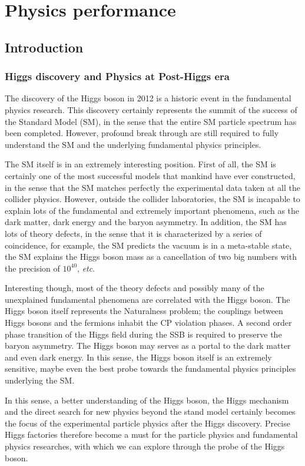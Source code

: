 \chapter{Physics performance}
\label{Chapter:Higgs}

\section{Introduction}
\subsection { Higgs discovery and Physics at Post-Higgs era }
The discovery of the Higgs boson in 2012 is a historic event in the  fundamental physics research.
This discovery certainly represents the summit of the success of the Standard Model (SM),
in the sense that the entire SM particle spectrum has been completed.
However, profound break through are still required to fully understand the SM and the underlying fundamental physics principles. 

The SM itself is in an extremely interesting position.
First of all, the SM is certainly one of the most successful models that mankind have ever constructed,
in the sense that the SM matches perfectly the experimental data taken at all the collider physics.
However, outside the collider laboratories, the SM is incapable to explain lots of the fundamental and extremely important phenomena,
such as the dark matter, dark energy and the baryon asymmetry.
In addition, the SM has lots of theory defects, in the sense that it is characterized by a series of coincidence,
for example, the SM predicts the vacuum is in a meta-stable state,
the SM explains the Higgs boson mass as a cancellation of two big numbers with the precision of $10^{40}$, {\it etc}. 

Interesting though, most of the theory defects and possibly many
of the unexplained fundamental phenomena are correlated with the Higgs boson.
The Higgs boson itself represents the Naturalness problem;
the couplings between Higgs bosons and the fermions inhabit the CP violation phases.
A second order phase transition of the Higgs field during the SSB is required to preserve the baryon asymmetry.
The Higgs boson may serves as a portal to the dark matter and even dark energy.
In this sense, the Higgs boson itself is an extremely sensitive,
maybe even the best probe towards the fundamental physics principles underlying the SM. 

In this sense, a better understanding of the Higgs boson,
the Higgs mechanism and the direct search for new physics
beyond the stand model certainly becomes the focus of the experimental particle physics after the Higgs discovery.
Precise Higgs factories therefore become a must for the particle physics and fundamental physics researches,
with which we can explore through the probe of the Higgs boson.

